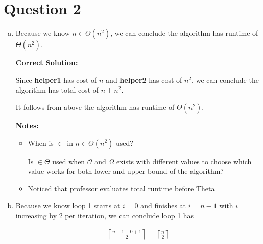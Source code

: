 \documentclass[12pt]{article}
\begin{document}
\section*{Question 2}
\begin{enumerate}[a.]
    \item

    Because we know $n \in \Theta(n^2)$, we can conclude the algorithm has runtime
    of $\Theta(n^2)$.

    \bigskip

    \begin{mdframed}
        \underline{\textbf{Correct Solution:}}

        \bigskip

        \color{red}
        Since \textbf{helper1} has cost of $n$ and \textbf{helper2} has cost of $n^2$,
        we can conclude the algorithm has total cost of $n + n^2$.

        \bigskip

        It follows from above the algorithm has runtime of $\Theta(n^2)$.

        \color{black}

    \end{mdframed}

    \textbf{Notes:}

    \begin{itemize}
        \item When is $\in$ in $n \in \Theta(n^2)$ used?

        \bigskip

        Is $\in \Theta$ used when $\mathcal{O}$ and $\Omega$ exists with
        different values to choose which value works for both lower and upper
        bound of the algorithm?

        \item Noticed that professor evaluates total runtime before Theta
    \end{itemize}

    \item

    Because we know loop 1 starts at $i = 0$ and finishes at $i = n - 1$ with $i$
    increasing by 2 per iteration, we can conclude loop 1 has

    \setcounter{equation}{0}
    \begin{align}
        \left\lceil \frac{n - 1 - 0 + 1}{2} \right\rceil = \left\lceil \frac{n}{2} \right\rceil
    \end{align}


\end{enumerate}
\end{document}
